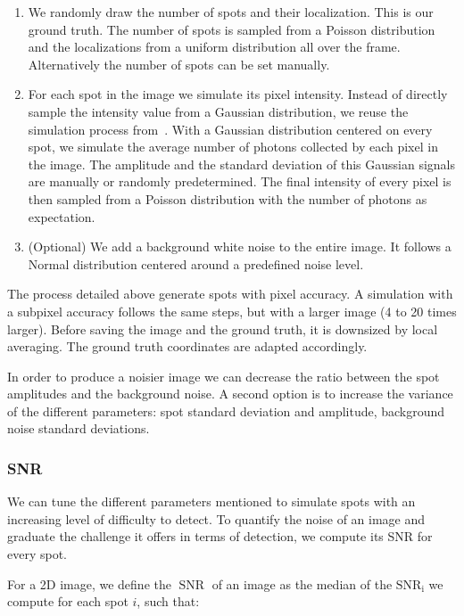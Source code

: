 \begin{enumerate}
	\item We randomly draw the number of spots and their localization.
	This is our ground truth.
	The number of spots is sampled from a Poisson distribution and the localizations from a uniform distribution all over the frame.
	Alternatively the number of spots can be set manually.
	\item For each spot in the image we simulate its pixel intensity.
	Instead of directly sample the intensity value from a Gaussian distribution, we reuse the simulation process from~\cite{bahry_rs-fish_2021}.
	With a Gaussian distribution centered on every spot, we simulate the average number of photons collected by each pixel in the image.
	The amplitude and the standard deviation of this Gaussian signals are manually or randomly predetermined.
	The final intensity of every pixel is then sampled from a Poisson distribution with the number of photons as expectation.
	\item (Optional) We add a background white noise to the entire image.
	It follows a Normal distribution centered around a predefined noise level.
\end{enumerate}


The process detailed above generate spots with pixel accuracy.
A simulation with a subpixel accuracy follows the same steps, but with a larger image (4 to 20 times larger).
Before saving the image and the ground truth, it is downsized by local averaging.
The ground truth coordinates are adapted accordingly.

In order to produce a noisier image we can decrease the ratio between the spot amplitudes and the background noise.
A second option is to increase the variance of the different parameters: spot standard deviation and amplitude, background noise standard deviations.

\subsubsection{\ac{SNR}}

We can tune the different parameters mentioned to simulate spots with an increasing level of difficulty to detect.
To quantify the noise of an image and graduate the challenge it offers in terms of detection, we compute its \ac{SNR} for every spot.

\noindent
For a 2D image, we define the $\operatorname{SNR}$ of an image as the median of the $\operatorname{SNR_i}$ we compute for each spot $i$, such that:

